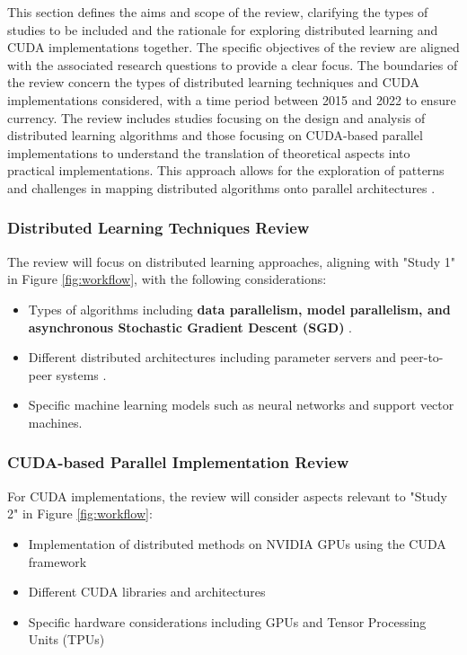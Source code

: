 This section defines the aims and scope of the review, clarifying the types of studies to be
included and the rationale for exploring distributed learning and CUDA implementations together.
The specific objectives of the review are aligned with the associated research questions to provide
a clear focus. The boundaries of the review concern the types of distributed learning techniques
and CUDA implementations considered, with a time period between 2015 and 2022 to ensure currency.
The review includes studies focusing on the design and analysis of distributed learning algorithms
and those focusing on CUDA-based parallel implementations to understand the translation of
theoretical aspects into practical implementations. This approach allows for the exploration of
patterns and challenges in mapping distributed algorithms onto parallel architectures
.

\subsubsection{Distributed Learning Techniques Review}
The review will focus on distributed learning approaches, aligning with "Study 1" in Figure
\ref{fig:workflow}, with the following considerations:
\begin{itemize}
	\item Types of algorithms including \textbf{data parallelism, model parallelism, and asynchronous
		      Stochastic Gradient Descent (SGD)} \cite{ben-nun_demystifying_2020,langer_distributed_2020}.
	\item Different distributed architectures including parameter servers and peer-to-peer systems
	      \cite{verbraeken_survey_2021,ben-nun_demystifying_2020,langer_distributed_2020}.
	\item Specific machine learning models such as neural networks and support vector machines.
\end{itemize}

\subsubsection{CUDA-based Parallel Implementation Review}
For CUDA implementations, the review will consider aspects relevant to "Study 2" in Figure
\ref{fig:workflow}:
\begin{itemize}
	\item Implementation of distributed methods on NVIDIA GPUs using the CUDA framework
	\item Different CUDA libraries and architectures
	\item Specific hardware considerations including GPUs and Tensor Processing Units (TPUs)
\end{itemize}

